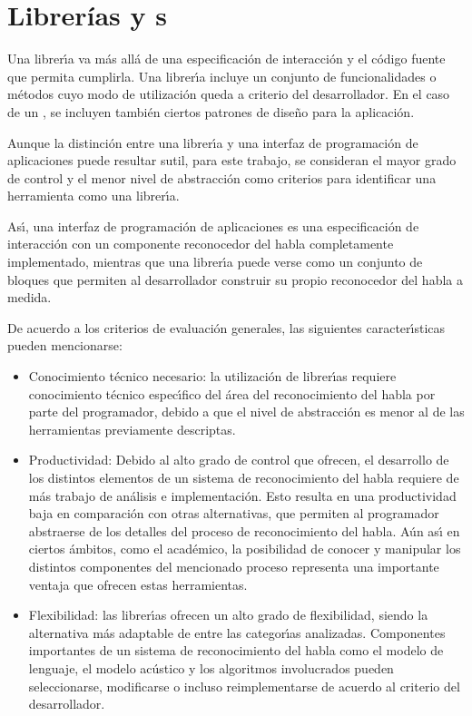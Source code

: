 \section{Librer\'ias y s}
\label{sec:librerias}

Una librer{\'\i}a va m\'as all\'a de una especificaci\'on de interacci\'on y el c\'odigo fuente que permita cumplirla.
Una librer{\'\i}a incluye un conjunto de funcionalidades o m\'etodos cuyo modo de utilizaci\'on queda a criterio
del desarrollador. En el caso de un , se incluyen tambi\'en ciertos patrones de dise\~no para la aplicaci\'on.

Aunque la distinci\'on entre una librer{\'\i}a y una interfaz de programaci\'on de aplicaciones puede resultar
sutil, para este trabajo, se consideran el mayor grado de control y el menor nivel de abstracci\'on
como criterios para identificar una herramienta como una librer{\'\i}a.

As{\'\i}, una interfaz de programaci\'on de aplicaciones es una especificaci\'on de interacci\'on con un componente
reconocedor del habla completamente implementado, mientras que una librer{\'\i}a puede verse como un conjunto
de bloques que permiten al desarrollador construir su propio reconocedor del habla a medida.

De acuerdo a los criterios de evaluaci\'on generales, las siguientes caracter{\'\i}sticas pueden mencionarse:

\begin{itemize}
 	\item Conocimiento t\'ecnico necesario: la utilizaci\'on de librer{\'\i}as requiere conocimiento t\'ecnico
 	espec{\'\i}fico del \'area del reconocimiento del habla por parte del programador, debido a que el nivel de
 	abstracci\'on es menor al de las herramientas previamente descriptas.
 	\item Productividad: Debido al alto grado de control que ofrecen, el desarrollo de los distintos
 	elementos de un sistema de reconocimiento del habla requiere de m\'as trabajo de an\'alisis e implementaci\'on.
 	Esto resulta en una productividad baja en comparaci\'on con otras alternativas, que permiten al
 	programador abstraerse de los detalles del proceso de reconocimiento del habla.
 	A\'un as{\'\i} en ciertos \'ambitos, como el acad\'emico, la posibilidad de conocer y manipular los distintos
 	componentes del mencionado proceso representa una importante ventaja que ofrecen estas herramientas.
 	\item Flexibilidad: las librer{\'\i}as ofrecen un alto grado de flexibilidad, siendo la alternativa
 	m\'as adaptable de entre las categor{\'\i}as analizadas. Componentes importantes de un sistema
 	de reconocimiento del habla como el modelo de lenguaje, el modelo ac\'ustico y los algoritmos involucrados
 	pueden seleccionarse, modificarse o incluso reimplementarse de acuerdo al criterio del desarrollador.
 \end{itemize}

